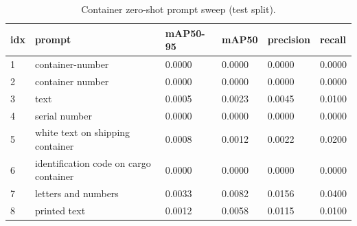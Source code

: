 \begin{table}[t]
\centering
\caption{Container zero-shot prompt sweep (test split).}\label{tab:promptctr}
\begin{tabular}{llllll}
\toprule
\textbf{idx} & \textbf{prompt} & \textbf{mAP50-95} & \textbf{mAP50} & \textbf{precision} & \textbf{recall} \\
\midrule
1 & container-number & 0.0000 & 0.0000 & 0.0000 & 0.0000 \\
2 & container number & 0.0000 & 0.0000 & 0.0000 & 0.0000 \\
3 & text & 0.0005 & 0.0023 & 0.0045 & 0.0100 \\
4 & serial number & 0.0000 & 0.0000 & 0.0000 & 0.0000 \\
5 & white text on shipping container & 0.0008 & 0.0012 & 0.0022 & 0.0200 \\
6 & identification code on cargo container & 0.0000 & 0.0000 & 0.0000 & 0.0000 \\
7 & letters and numbers & 0.0033 & 0.0082 & 0.0156 & 0.0400 \\
8 & printed text & 0.0012 & 0.0058 & 0.0115 & 0.0100 \\
\bottomrule
\end{tabular}
\end{table}
